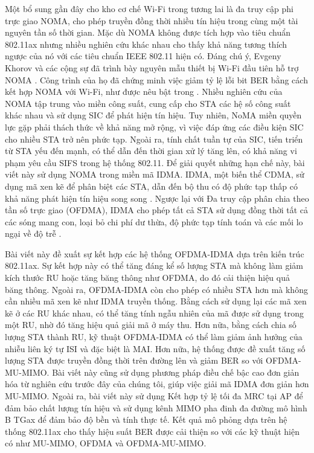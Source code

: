 Một bổ sung gần đây cho kho cơ chế Wi-Fi trong tương lai là đa truy cập phi trực giao \acrshort{NOMA}, cho phép truyền đồng thời nhiều tín hiệu trong cùng một tài nguyên tần số thời gian. Mặc dù NOMA không được tích hợp vào tiêu chuẩn 802.11ax nhưng nhiều nghiên cứu khác nhau cho thấy khả năng tương thích ngược của nó với các tiêu chuẩn IEEE 802.11 hiện có. Đáng chú ý, Evgeny Khorov và các cộng sự đã trình bày nguyên mẫu thiết bị Wi-Fi đầu tiên hỗ trợ NOMA \cite{NOMA_WiFi}. Công trình của họ đã chứng minh việc giảm tỷ lệ lỗi bit \acrshort{BER} bằng cách kết hợp NOMA với Wi-Fi, như được nêu bật trong \cite{PhaseNoise}.
Nhiều nghiên cứu của NOMA tập trung vào miền công suất, cung cấp cho STA các hệ số công suất khác nhau và sử dụng \acrfull{SIC} để phát hiện tín hiệu. Tuy nhiên, NoMA miền quyền lực gặp phải thách thức về khả năng mở rộng, vì việc đáp ứng các điều kiện \acrshort{SIC} cho nhiều STA trở nên phức tạp.
Ngoài ra, tính chất tuần tự của SIC, tiến triển từ STA yếu đến mạnh, có thể dẫn đến thời gian xử lý tăng lên, có khả năng vi phạm yêu cầu \acrfull{SIFS} trong hệ thống 802.11. Để giải quyết những hạn chế này, bài viết này sử dụng NOMA trong miền mã \acrfull{IDMA}. IDMA, một biến thể \acrfull{CDMA}, sử dụng mã xen kẽ để phân biệt các STA, dẫn đến bộ thu có độ phức tạp thấp có khả năng phát hiện tín hiệu song song \cite{IDMA}. Ngược lại với Đa truy cập phân chia theo tần số trực giao (OFDMA), IDMA cho phép tất cả STA sử dụng đồng thời tất cả các sóng mang con, loại bỏ chi phí dư thừa, độ phức tạp tính toán và các mối lo ngại về độ trễ \cite{IDMA_Per}.

Bài viết này đề xuất sự kết hợp các hệ thống OFDMA-IDMA dựa trên kiến trúc 802.11ax.
Sự kết hợp này có thể tăng đáng kể số lượng STA mà không làm giảm kích thước RU hoặc tăng băng thông như OFDMA, do đó cải thiện hiệu quả băng thông.
Ngoài ra, OFDMA-IDMA còn cho phép có nhiều STA hơn mà không cần nhiều mã xen kẽ như IDMA truyền thống. Bằng cách sử dụng lại các mã xen kẽ ở các RU khác nhau, có thể tăng tính ngẫu nhiên của mã được sử dụng trong một RU, nhờ đó tăng hiệu quả giải mã ở máy thu.
Hơn nữa, bằng cách chia số lượng STA thành RU, kỹ thuật OFDMA-IDMA có thể làm giảm ảnh hưởng của nhiễu liên ký tự \acrfull{ISI} và đặc biệt là \acrshort{MAI}.
Hơn nữa, hệ thống được đề xuất tăng số lượng STA được truyền đồng thời trên đường lên và giảm BER so với OFDMA-MU-MIMO. Bài viết này cũng sử dụng phương pháp điều chế bậc cao đơn giản hóa \cite{IDMAHighOder} từ nghiên cứu trước đây của chúng tôi, giúp việc giải mã IDMA đơn giản hơn MU-MIMO.
Ngoài ra, bài viết này sử dụng Kết hợp tỷ lệ tối đa \acrshort{MRC} tại AP để đảm bảo chất lượng tín hiệu và sử dụng kênh \acrshort{MIMO} pha đinh đa đường mô hình B TGax \cite{TGax} để đảm bảo độ bền và tính thực tế. Kết quả mô phỏng dựa trên hệ thống 802.11ax cho thấy hiệu suất BER được cải thiện so với các kỹ thuật hiện có như MU-MIMO, OFDMA và OFDMA-MU-MIMO.

